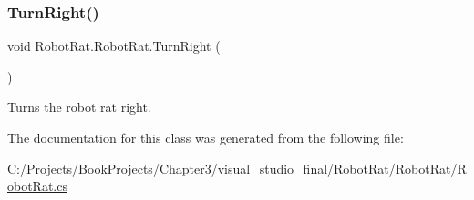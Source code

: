 \subsubsection{\texorpdfstring{Turn\+Right()}{TurnRight()}}
{\footnotesize\ttfamily void Robot\+Rat.\+Robot\+Rat.\+Turn\+Right (\begin{DoxyParamCaption}{ }\end{DoxyParamCaption})}



Turns the robot rat right. 



The documentation for this class was generated from the following file\+:\begin{DoxyCompactItemize}
\item 
C\+:/\+Projects/\+Book\+Projects/\+Chapter3/visual\+\_\+studio\+\_\+final/\+Robot\+Rat/\+Robot\+Rat/\hyperlink{_robot_rat_8cs}{Robot\+Rat.\+cs}\end{DoxyCompactItemize}
